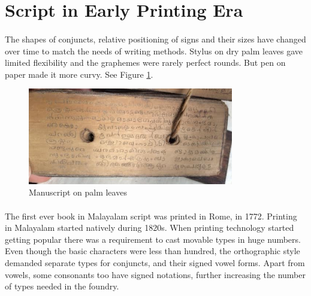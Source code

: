 \documentclass[10pt]{article}
\begin{document}
\section{Script in Early Printing Era}

\paragraph{}
The shapes of conjuncts, relative positioning of signs and their sizes have changed over time to match the needs of writing methods. Stylus on dry palm leaves gave limited flexibility and the graphemes were rarely perfect rounds. But pen on paper made it more curvy. See Figure \ref{palmleaves}.

\begin{figure}[h!]
	\centering
	\includegraphics[width=0.8\textwidth]{images/manuscipt.png}
	\caption{Manuscript on palm leaves}
	\label{palmleaves}
\end{figure} 

\paragraph{}
The first ever book in Malayalam script was printed in Rome, in 1772. Printing in Malayalam started natively during 1820s\cite{babucherian}. When printing technology started getting popular there was a requirement to cast movable types in huge numbers. Even though the basic characters were less than hundred, the orthographic style demanded separate types for conjuncts, and their signed vowel forms. Apart from vowels, some consonants too have signed notations, further increasing the number of types needed in the foundry. 
\end{document}
